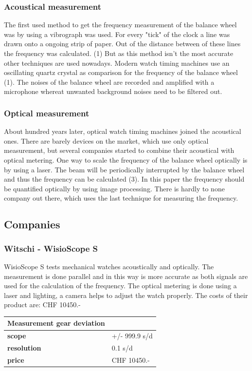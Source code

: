 \documentclass[12pt, a4paper]{report}
\begin{document}
\subsubsection{Acoustical measurement}
The first used method to get the frequency measurement of the balance wheel was by using a vibrograph was used. For every "tick" of the clock a line was drawn onto a ongoing strip of paper. Out of the distance between of these lines the frequency was calculated. (1) But as this method isn't the most accurate other techniques are used nowadays.  
Modern watch timing machines use an oscillating quartz crystal as comparison for the frequency of the balance wheel (1). The noises of the balance wheel are recorded and amplified with a microphone whereat unwanted background noises need to be filtered out. 

\subsubsection{Optical measurement}
About hundred years later, optical watch timing machines joined the acoustical ones. There are barely devices on the market, which use only optical measurement, but several companies started to combine their acoustical with optical metering. One way to scale the frequency of the balance wheel optically is by using a laser. The beam will be periodically interrupted by the balance wheel and thus the frequency can be calculated (3). In this paper the frequency should be quantified optically by using image processing. There is hardly to none company out there, which uses the last technique for measuring the frequency.

\subsection{Companies}
\subsubsection{Witschi - WisioScope S}
WisioScope S tests mechanical watches acoustically and optically. The measurement is done parallel and in this way is more accurate as both signals are used for the calculation of the frequency.
The optical metering is done using a laser and lighting, a camera helps to adjust the watch properly. The costs of their product are: CHF 10450.-

\bigskip

\begin{tabularx}{\textwidth}{>{\bfseries}lX}
Measurement gear deviation & \\\toprule
scope & +/- 999.9 s/d \\\midrule
resolution & 0.1 s/d\\\midrule
price & CHF 10450.-\\\bottomrule
\end{tabularx}
\end{document}
